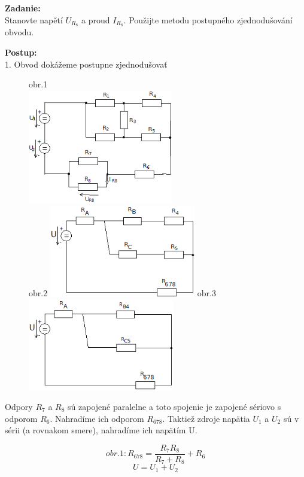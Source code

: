 \documentclass[a4paper,12pt]{article}
\begin{document}
\begin{flushleft}
\textbf{Zadanie:}\\
Stanovte napětí $U_{R_8}$ a proud $I_{R_8}$. Použijte metodu postupného zjednodušování obvodu.
\end{flushleft}
\begin{flushleft}
\textbf{Postup:} \\ 
1. Obvod dokážeme postupne zjednodušovať \\
\end{flushleft}\begin{figure}[!h]
  \centering
  obr.1\\
  \bigskip
  \includegraphics[height=5cm]{obrazky/pr1a} \\
  \bigskip
  obr.2
  \includegraphics[height=4cm]{obrazky/pr1b} 
  obr.3
  \includegraphics[height=4cm]{obrazky/pr1c} \\
  \bigskip
\end{figure}
\bigskip

\begin{flushleft}
Odpory $R_7$ a $R_8$ sú zapojené paralelne a toto spojenie je zapojené sériovo s odporom $R_6$. Nahradíme ich odporom $R_{678}$. Taktiež zdroje napätia $U_1$ a $U_2$ sú v sérii (a rovnakom smere), nahradíme ich napätím U.
\end{flushleft}
\begin{equation*}
obr.1 : R_{678} = \frac{R_{7}R_{8}}{R_7+R_8} + R_6
\end{equation*}
\begin{equation*}
U = U_1 + U_2
\end{equation*}
\end{document}
